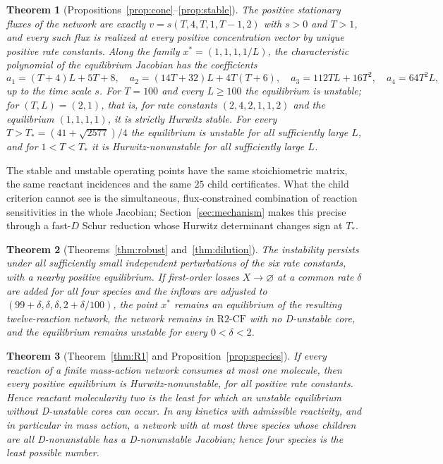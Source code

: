 \documentclass[11pt,a4paper]{article}
\theoremstyle{plain}
\newtheorem{theorem}{Theorem}[section]
\theoremstyle{definition}
\theoremstyle{remark}
\newcommand{\xs}{x^{*}}
\newcommand{\Rcf}{\mathrm{R2\text{-}CF}}
\begin{document}
\begin{theorem}[Propositions~\ref{prop:cone}--\ref{prop:stable}]\label{thm:B}
The positive stationary fluxes of the network are exactly $v=s(T,4,T,1,T-1,2)$ with $s>0$ and $T>1$, and every such flux is realized at every positive concentration vector by unique positive rate constants. Along the family $\xs=(1,1,1,1/L)$, the characteristic polynomial of the equilibrium Jacobian has the coefficients
\[
a_1=(T+4)L+5T+8,\quad a_2=(14T+32)L+4T(T+6),\quad a_3=112TL+16T^2,\quad a_4=64T^2L,
\]
up to the time scale $s$. For $T=100$ and every $L\ge100$ the equilibrium is unstable; for $(T,L)=(2,1)$, that is, for rate constants $(2,4,2,1,1,2)$ and the equilibrium $(1,1,1,1)$, it is strictly Hurwitz stable. For every $T>T_*=(41+\sqrt{2577})/4$ the equilibrium is unstable for all sufficiently large $L$, and for $1<T<T_*$ it is Hurwitz-nonunstable for all sufficiently large $L$.
\end{theorem}

The stable and unstable operating points have the same stoichiometric matrix, the same reactant incidences and the same $25$ child certificates. What the child criterion cannot see is the simultaneous, flux-constrained combination of reaction sensitivities in the whole Jacobian; Section~\ref{sec:mechanism} makes this precise through a fast-$D$ Schur reduction whose Hurwitz determinant changes sign at $T_*$.

\begin{theorem}[Theorems~\ref{thm:robust} and~\ref{thm:dilution}]\label{thm:C}
The instability persists under all sufficiently small independent perturbations of the six rate constants, with a nearby positive equilibrium. If first-order losses $X\to\varnothing$ at a common rate $\delta$ are added for all four species and the inflows are adjusted to $(99+\delta,\delta,\delta,2+\delta/100)$, the point $\xs$ remains an equilibrium of the resulting twelve-reaction network, the network remains in $\Rcf$ with no D-unstable core, and the equilibrium remains unstable for every $0<\delta<2$.
\end{theorem}

\begin{theorem}[Theorem~\ref{thm:R1} and Proposition~\ref{prop:species}]\label{thm:D}
If every reaction of a finite mass-action network consumes at most one molecule, then every positive equilibrium is Hurwitz-nonunstable, for all positive rate constants. Hence reactant molecularity two is the least for which an unstable equilibrium without D-unstable cores can occur. In any kinetics with admissible reactivity, and in particular in mass action, a network with at most three species whose children are all D-nonunstable has a D-nonunstable Jacobian; hence four species is the least possible number.
\end{theorem}
\end{document}
